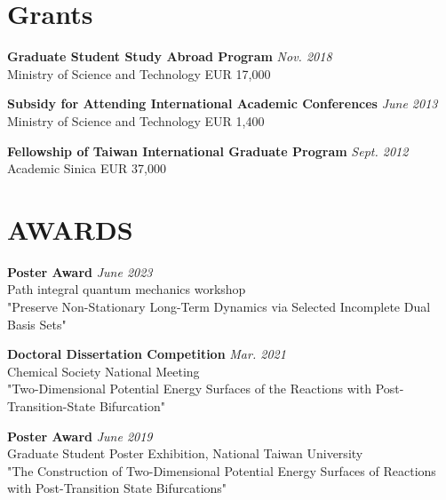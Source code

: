 \section{\sc Grants}

{\bf Graduate Student Study Abroad Program}  \hfill \textit{Nov. 2018} \\
Ministry of Science and Technology  \hfill   EUR 17,000

{\bf Subsidy for Attending International Academic Conferences} \hfill \textit{June 2013} \\
Ministry of Science and Technology \hfill  EUR 1,400

{\bf Fellowship of Taiwan International Graduate Program} \hfill  \textit{Sept. 2012} \\
Academic Sinica \hfill  EUR 37,000

\section{\sc AWARDS} 



{\bf Poster Award} \hfill \textit{June 2023}  \\
Path integral quantum mechanics workshop \\
"Preserve Non-Stationary Long-Term Dynamics via Selected
Incomplete Dual Basis Sets" 

{\bf Doctoral Dissertation Competition}  \hfill \textit{Mar. 2021} \\
Chemical Society National Meeting \\
"Two-Dimensional Potential Energy Surfaces of the Reactions with Post-Transition-State Bifurcation"

{\bf Poster Award} \hfill \textit{June 2019}  \\
Graduate Student Poster Exhibition,
National Taiwan University \\
"The Construction of Two-Dimensional Potential Energy
Surfaces of Reactions with Post-Transition State Bifurcations"


\endinput